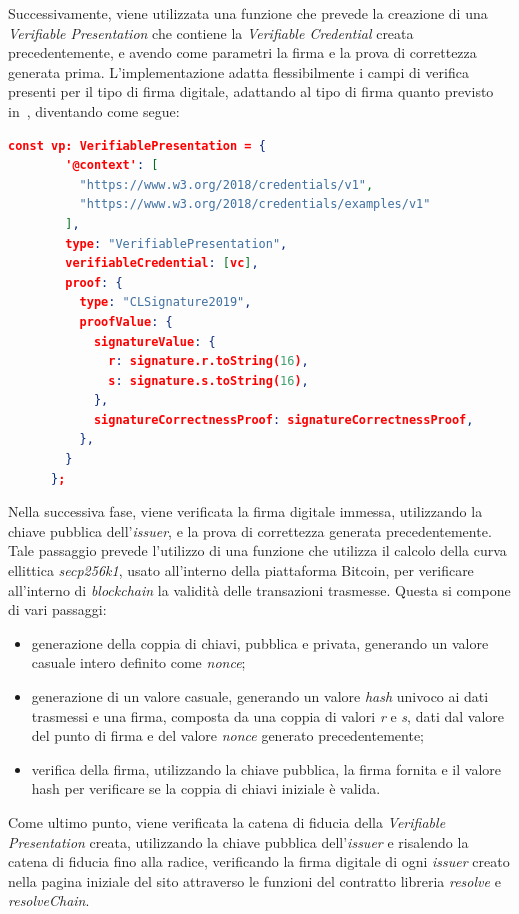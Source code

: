 Successivamente, viene utilizzata una funzione che prevede la creazione di una \textit{Verifiable Presentation} che contiene la \textit{Verifiable Credential} creata precedentemente,
e avendo come parametri la firma e la prova di correttezza generata prima. L'implementazione adatta flessibilmente i campi di verifica presenti per il tipo di firma digitale, adattando al tipo di firma quanto previsto in~\cite{site:vpw3c}, diventando come segue:
\begin{lstlisting}[language=json]
    const vp: VerifiablePresentation = {
        '@context': [
          "https://www.w3.org/2018/credentials/v1",
          "https://www.w3.org/2018/credentials/examples/v1"
        ],
        type: "VerifiablePresentation",
        verifiableCredential: [vc],
        proof: {
          type: "CLSignature2019",
          proofValue: {
            signatureValue: {
              r: signature.r.toString(16),
              s: signature.s.toString(16),
            },
            signatureCorrectnessProof: signatureCorrectnessProof,
          },
        }
      };
\end{lstlisting}

Nella successiva fase, viene verificata la firma digitale immessa, utilizzando la chiave pubblica dell'\textit{issuer}, e la prova di correttezza generata precedentemente.
Tale passaggio prevede l'utilizzo di una funzione che utilizza il calcolo della curva ellittica \textit{secp256k1}, usato all'interno della piattaforma Bitcoin, per verificare all'interno di \textit{blockchain}
la validità delle transazioni trasmesse. Questa si compone di vari passaggi:
\begin{itemize}
    \item generazione della coppia di chiavi, pubblica e privata, generando un valore casuale intero definito come \textit{nonce};
    \item generazione di un valore casuale, generando un valore \textit{hash} univoco ai dati trasmessi e una firma, composta da una coppia di valori \textit{r} e \textit{s}, 
    dati dal valore del punto di firma e del valore \textit{nonce} generato precedentemente;
    \item verifica della firma, utilizzando la chiave pubblica, la firma fornita e il valore hash per verificare se la coppia di chiavi iniziale è valida.
\end{itemize}

Come ultimo punto, viene verificata la catena di fiducia della \textit{Verifiable Presentation} creata, utilizzando la chiave pubblica dell'\textit{issuer} e risalendo
la catena di fiducia fino alla radice, verificando la firma digitale di ogni \textit{issuer} creato nella pagina iniziale del sito attraverso le funzioni del contratto libreria
\textit{resolve} e \textit{resolveChain}.

